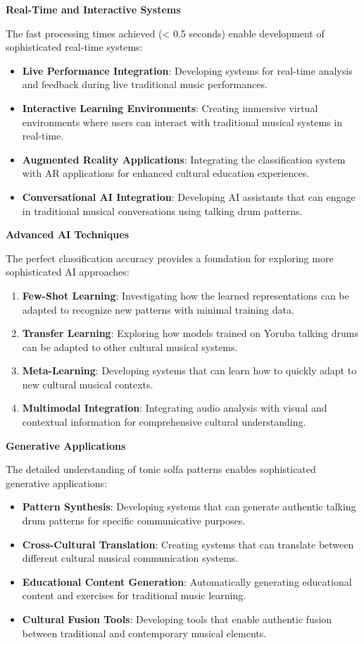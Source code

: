 \documentclass[12pt,a4paper]{article}
\begin{document}
\textbf{Real-Time and Interactive Systems}

The fast processing times achieved (< 0.5 seconds) enable development of sophisticated real-time systems:

\begin{itemize}
\item \textbf{Live Performance Integration}: Developing systems for real-time analysis and feedback during live traditional music performances.
\item \textbf{Interactive Learning Environments}: Creating immersive virtual environments where users can interact with traditional musical systems in real-time.
\item \textbf{Augmented Reality Applications}: Integrating the classification system with AR applications for enhanced cultural education experiences.
\item \textbf{Conversational AI Integration}: Developing AI assistants that can engage in traditional musical conversations using talking drum patterns.
\end{itemize}

\textbf{Advanced AI Techniques}

The perfect classification accuracy provides a foundation for exploring more sophisticated AI approaches:

\begin{enumerate}
\item \textbf{Few-Shot Learning}: Investigating how the learned representations can be adapted to recognize new patterns with minimal training data.
\item \textbf{Transfer Learning}: Exploring how models trained on Yoruba talking drums can be adapted to other cultural musical systems.
\item \textbf{Meta-Learning}: Developing systems that can learn how to quickly adapt to new cultural musical contexts.
\item \textbf{Multimodal Integration}: Integrating audio analysis with visual and contextual information for comprehensive cultural understanding.
\end{enumerate}

\textbf{Generative Applications}

The detailed understanding of tonic solfa patterns enables sophisticated generative applications:

\begin{itemize}
\item \textbf{Pattern Synthesis}: Developing systems that can generate authentic talking drum patterns for specific communicative purposes.
\item \textbf{Cross-Cultural Translation}: Creating systems that can translate between different cultural musical communication systems.
\item \textbf{Educational Content Generation}: Automatically generating educational content and exercises for traditional music learning.
\item \textbf{Cultural Fusion Tools}: Developing tools that enable authentic fusion between traditional and contemporary musical elements.
\end{itemize}
\end{document}

